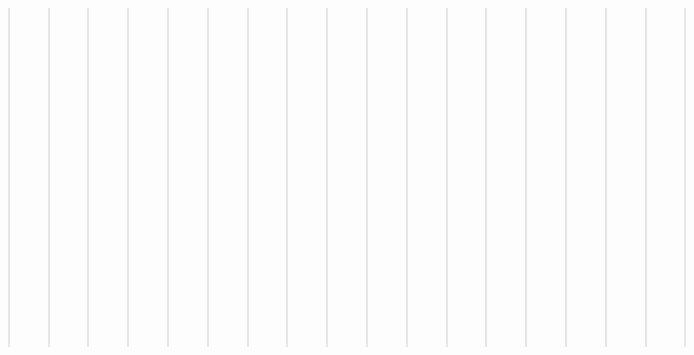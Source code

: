 \documentclass[letterpaper,10pt,english]{sphinxmanual}
\begin{document}
\begin{quote}
\begin{quote}
\begin{quote}
\begin{quote}
\begin{quote}
\begin{quote}
\begin{quote}
\begin{quote}
\begin{quote}
\begin{quote}
\begin{quote}
\begin{quote}
\begin{quote}
\begin{quote}
\begin{quote}
\begin{quote}
\begin{quote}
\begin{quote}
\begin{quote}
\begin{quote}
\begin{quote}
\begin{quote}
\begin{quote}
\begin{quote}
\begin{quote}
\begin{quote}
\begin{quote}
\begin{quote}
\begin{quote}
\begin{quote}
\begin{quote}
\begin{quote}
\begin{quote}
\begin{quote}
\begin{quote}
\begin{quote}
\begin{quote}
\begin{quote}
\begin{quote}
\begin{quote}
\begin{quote}
\begin{quote}
\begin{quote}
\begin{quote}
\begin{quote}
\begin{quote}
\begin{quote}
\begin{quote}
\begin{quote}
\begin{quote}
\begin{quote}
\begin{quote}
\begin{quote}
\begin{quote}
\begin{quote}
\begin{quote}
\begin{quote}
\begin{quote}
\begin{quote}
\begin{quote}
\begin{quote}
\begin{quote}
\begin{quote}
\begin{quote}
\begin{quote}
\begin{quote}
\begin{quote}
\begin{quote}
\begin{quote}
\begin{quote}
\begin{quote}
\begin{quote}
\begin{quote}
\begin{quote}
\begin{quote}
\begin{quote}
\begin{quote}
\begin{quote}
\begin{quote}
\begin{quote}
\begin{quote}
\begin{quote}
\begin{quote}
\begin{quote}
\begin{quote}
\begin{quote}
\begin{quote}
\begin{quote}
\begin{quote}
\begin{quote}
\begin{quote}
\begin{quote}
\begin{quote}
\begin{sphinxShadowBox}
\begin{itemize}

\sphinxAtStartPar
{}\label{\detokenize{database_schema:id107}}{\hyperref[\detokenize{database_schema:region-table}]{}}

\item {} 
\sphinxAtStartPar
{}\label{\detokenize{database_schema:id108}}{\hyperref[\detokenize{database_schema:province-table}]{}}
=======
\label{\detokenize{schema_tables:id264}}{\hyperref[\detokenize{schema_tables:overview-table}]{}}

\item {} 
\sphinxAtStartPar
{}\label{\detokenize{schema_tables:id265}}{\hyperref[\detokenize{schema_tables:aggressor-table}]{}}

\item {} 
\sphinxAtStartPar
{}\label{\detokenize{schema_tables:id266}}{\hyperref[\detokenize{schema_tables:victim-table}]{}}

\item {} 
\sphinxAtStartPar
{}\label{\detokenize{schema_tables:id267}}{\hyperref[\detokenize{schema_tables:human-rights-category-table}]{}}

\item {} 
\sphinxAtStartPar
{}\label{\detokenize{schema_tables:id268}}{\hyperref[\detokenize{schema_tables:human-rights-offense-table}]{}}

\item {} 
\sphinxAtStartPar
{}\label{\detokenize{schema_tables:id269}}{\hyperref[\detokenize{schema_tables:region-table}]{}}

\item {} 
\end{itemize}
\end{sphinxShadowBox}
\end{quote}
\end{quote}
\end{quote}
\end{quote}
\end{quote}
\end{quote}
\end{quote}
\end{quote}
\end{quote}
\end{quote}
\end{quote}
\end{quote}
\end{quote}
\end{quote}
\end{quote}
\end{quote}
\end{quote}
\end{quote}
\end{quote}
\end{quote}
\end{quote}
\end{quote}
\end{quote}
\end{quote}
\end{quote}
\end{quote}
\end{quote}
\end{quote}
\end{quote}
\end{quote}
\end{quote}
\end{quote}
\end{quote}
\end{quote}
\end{quote}
\end{quote}
\end{quote}
\end{quote}
\end{quote}
\end{quote}
\end{quote}
\end{quote}
\end{quote}
\end{quote}
\end{quote}
\end{quote}
\end{quote}
\end{quote}
\end{quote}
\end{quote}
\end{quote}
\end{quote}
\end{quote}
\end{quote}
\end{quote}
\end{quote}
\end{quote}
\end{quote}
\end{quote}
\end{quote}
\end{quote}
\end{quote}
\end{quote}
\end{quote}
\end{quote}
\end{quote}
\end{quote}
\end{quote}
\end{quote}
\end{quote}
\end{quote}
\end{quote}
\end{quote}
\end{quote}
\end{quote}
\end{quote}
\end{quote}
\end{quote}
\end{quote}
\end{quote}
\end{quote}
\end{quote}
\end{quote}
\end{quote}
\end{quote}
\end{quote}
\end{quote}
\end{quote}
\end{quote}
\end{quote}
\end{quote}
\end{quote}
\end{quote}
\end{document}
